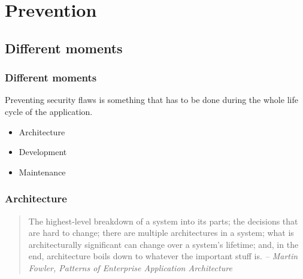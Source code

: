 \section{Prevention}

\begin{frame}
\sectionpage
\end{frame}

\subsection{Different moments}

\begin{frame}
\frametitle{Different moments}
Preventing security flaws is something that has to be done during the
whole life cycle of the application.
\begin{itemize}
\item Architecture
\item Development
\item Maintenance
\end{itemize}
\end{frame}

\begin{frame}
\frametitle{Architecture}
\begin{quote}
The highest-level breakdown of a system into its parts; the decisions that are
hard to change; there are multiple architectures in a system; what is
architecturally significant can change over a system's lifetime; and, in the
end, architecture boils down to whatever the important stuff is.
\textit{-- Martin Fowler, Patterns of Enterprise Application Architecture}
\end{quote}
\end{frame}


